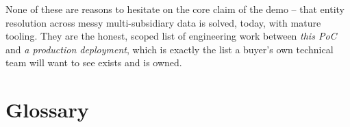 \documentclass[11pt]{report}
\begin{document}
\begin{bizbox}
None of these are reasons to hesitate on the core claim of the demo -- that entity resolution across messy multi-subsidiary data is solved, today, with mature tooling. They are the honest, scoped list of engineering work between \emph{this PoC} and \emph{a production deployment}, which is exactly the list a buyer's own technical team will want to see exists and is owned.
\end{bizbox}

\chapter{Glossary}
\end{document}
